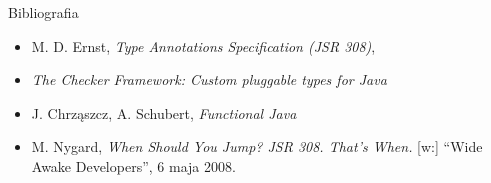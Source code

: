 \documentclass{beamer}
\begin{document}
\begin{frame}{Bibliografia}
  \begin{itemize}
  \item M. D. Ernst, \emph{Type Annotations Specification (JSR 308)}, 
  \item \emph{The Checker Framework: Custom pluggable types for Java}
  \item J. Chrząszcz, A. Schubert, \emph{Functional Java}
  \item M. Nygard, \emph{When Should You Jump? JSR 308. That's When.} [w:] ``Wide Awake Developers'', 6 maja 2008.
  \end{itemize}
\end{frame}
\end{document}
